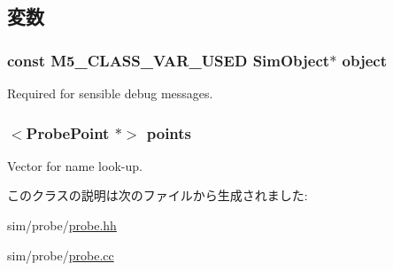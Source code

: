 \subsection{変数}
\hypertarget{classProbeManager_ad7b766250212156ad2c446f0b0522186}{
\subsubsection[{object}]{\setlength{\rightskip}{0pt plus 5cm}const M5\_\-CLASS\_\-VAR\_\-USED {\bf SimObject}$\ast$ {\bf object}}}
\label{classProbeManager_ad7b766250212156ad2c446f0b0522186}
Required for sensible debug messages. \hypertarget{classProbeManager_acfbbc709561ad2af0b0ce4b78ce29458}{
\subsubsection[{points}]{$<${\bf ProbePoint} $\ast$$>$ {\bf points}}}
\label{classProbeManager_acfbbc709561ad2af0b0ce4b78ce29458}
Vector for name look-\/up. 

このクラスの説明は次のファイルから生成されました:\begin{DoxyCompactItemize}
\item 
sim/probe/\hyperlink{probe_8hh}{probe.hh}\item 
sim/probe/\hyperlink{probe_8cc}{probe.cc}\end{DoxyCompactItemize}
